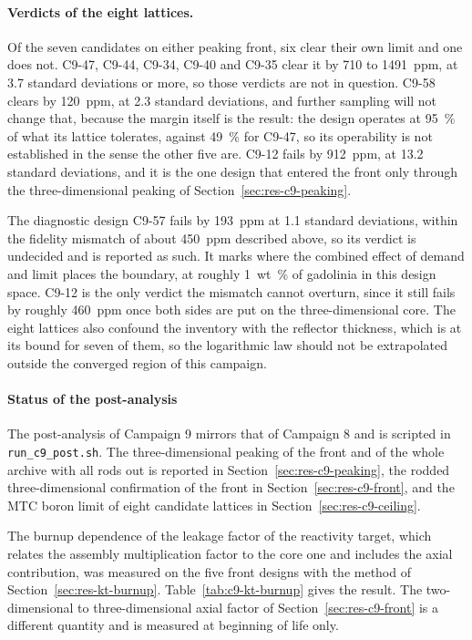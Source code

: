 \paragraph{Verdicts of the eight lattices.}
Of the seven candidates on either peaking front, six clear their own
limit and one does not. C9-47, C9-44, C9-34, C9-40 and C9-35 clear it
by 710 to \SI{1491}{ppm}, at 3.7 standard deviations or more, so those
verdicts are not in question. C9-58 clears by \SI{120}{ppm}, at 2.3
standard deviations, and further sampling will not change that, because
the margin itself is the result: the design operates at \SI{95}{\%} of
what its lattice tolerates, against \SI{49}{\%} for C9-47, so its
operability is not established in the sense the other five are. C9-12
fails by \SI{912}{ppm}, at 13.2 standard deviations, and it is the one
design that entered the front only through the three-dimensional
peaking of Section~\ref{sec:res-c9-peaking}.

The diagnostic design C9-57 fails by \SI{193}{ppm} at 1.1 standard
deviations, within the fidelity mismatch of about \SI{450}{ppm}
described above, so its verdict is undecided and is reported as such.
It marks where the combined effect of demand and limit places the
boundary, at roughly \SI{1}{wt\%} of gadolinia in this design space.
C9-12 is the only verdict the mismatch cannot overturn, since it still
fails by roughly \SI{460}{ppm} once both sides are put on the
three-dimensional core. The eight lattices also confound the inventory
with the reflector thickness, which is at its bound for seven of them,
so the logarithmic law should not be extrapolated outside the converged
region of this campaign.

\paragraph{Status of the post-analysis}
\label{sec:res-c9-post}

The post-analysis of Campaign 9 mirrors that of Campaign 8 and is scripted
in \texttt{run\_c9\_post.sh}. The three-dimensional peaking of the front and
of the whole archive with all rods out is reported in
Section~\ref{sec:res-c9-peaking}, the rodded three-dimensional confirmation
of the front in Section~\ref{sec:res-c9-front}, and the MTC boron limit of
eight candidate lattices in Section~\ref{sec:res-c9-ceiling}.

The burnup dependence of the leakage factor of the reactivity target, which relates
the assembly multiplication factor to the core one and includes the axial
contribution, was measured on the five front designs with the method of
Section~\ref{sec:res-kt-burnup}. Table~\ref{tab:c9-kt-burnup} gives the
result. The two-dimensional to three-dimensional axial factor of
Section~\ref{sec:res-c9-front} is a different quantity and is measured at
beginning of life only.

